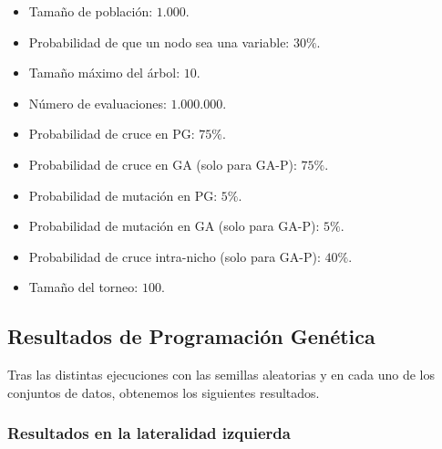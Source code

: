 \begin{itemize}
	\item Tamaño de población: $1.000$.
	\item Probabilidad de que un nodo sea una variable: $30\%$.
	\item Tamaño máximo del árbol: $10$.
	\item Número de evaluaciones: $1.000.000$.
	\item Probabilidad de cruce en PG: $75\%$.
	\item Probabilidad de cruce en GA (solo para GA-P): $75\%$.
	\item Probabilidad de mutación en PG: $5\%$.
	\item Probabilidad de mutación en GA (solo para GA-P): $5\%$.
	\item Probabilidad de cruce intra-nicho (solo para GA-P): $40\%$.
	\item Tamaño del torneo: $100$.
\end{itemize}

\newpage

\subsection{Resultados de Programación Genética}

Tras las distintas ejecuciones con las semillas aleatorias y en cada uno de los conjuntos de datos, obtenemos los siguientes resultados.


\subsubsection{Resultados en la lateralidad izquierda}


